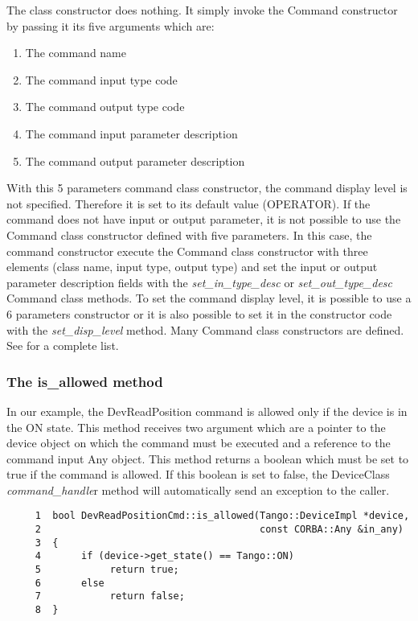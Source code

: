 The class constructor does nothing. It simply invoke the Command
constructor by passing it its five arguments which are:
\begin{enumerate}
\item The command name
\item The command input type code
\item The command output type code
\item The command input parameter description
\item The command output parameter description
\end{enumerate}
With this 5 parameters command class constructor, the command display
level is not specified. Therefore it is set to its default value (OPERATOR).
If the command does not have input or output parameter, it is not
possible to use the Command class constructor defined with five parameters.
In this case, the command constructor execute the Command class constructor
with three elements (class name, input type, output type) and set
the input or output parameter description fields with the \emph{set\_in\_type\_desc}
or \emph{set\_out\_type\_desc} Command class
methods. To set the command display level, it is possible to use a
6 parameters constructor or it is also possible to set it in the constructor
code with the \emph{set\_disp\_level} method.
Many Command class constructors are defined. See \cite{TANGO_ref_man}for
a complete list.


\subsubsection{The is\_allowed method}

In our example, the DevReadPosition command is allowed only if the
device is in the ON state. This method receives two argument which
are a pointer to the device object on which the command must be executed
and a reference to the command input Any object. This method returns
a boolean which must be set to true if the command is allowed. If
this boolean is set to false, the DeviceClass
\emph{command\_handle}r method will automatically
send an exception to the caller.


\begin{verbatim}
     1  bool DevReadPositionCmd::is_allowed(Tango::DeviceImpl *device,
     2                                      const CORBA::Any &in_any)
     3  {
     4       if (device->get_state() == Tango::ON)
     5            return true;
     6       else
     7            return false;
     8  }
\end{verbatim}


